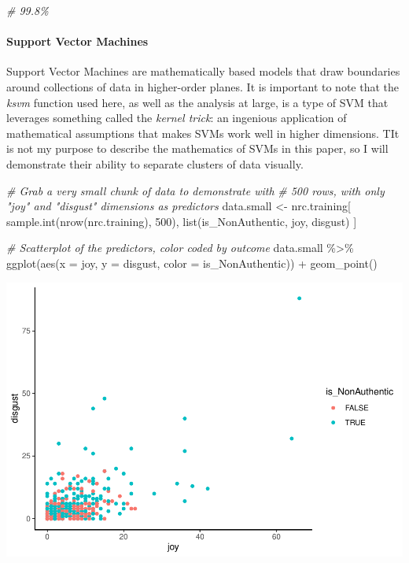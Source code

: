 \documentclass[
]{article}
\newenvironment{Shaded}{\begin{snugshade}}{\end{snugshade}}
\newcommand{\AttributeTok}[1]{\textcolor[rgb]{0.77,0.63,0.00}{#1}}
\newcommand{\CommentTok}[1]{\textcolor[rgb]{0.56,0.35,0.01}{\textit{#1}}}
\newcommand{\DecValTok}[1]{\textcolor[rgb]{0.00,0.00,0.81}{#1}}
\newcommand{\FunctionTok}[1]{\textcolor[rgb]{0.00,0.00,0.00}{#1}}
\newcommand{\NormalTok}[1]{#1}
\newcommand{\OtherTok}[1]{\textcolor[rgb]{0.56,0.35,0.01}{#1}}
\newcommand{\SpecialCharTok}[1]{\textcolor[rgb]{0.00,0.00,0.00}{#1}}
\begin{document}
\begin{Shaded}
\begin{Highlighting}[]
\CommentTok{\# 99.8\%}
\end{Highlighting}
\end{Shaded}

\hypertarget{support-vector-machines}{%
\paragraph{Support Vector Machines}\label{support-vector-machines}}

Support Vector Machines are mathematically based models that draw
boundaries around collections of data in higher-order planes. It is
important to note that the \emph{ksvm} function used here, as well as
the analysis at large, is a type of SVM that leverages something called
the \emph{kernel trick}: an ingenious application of mathematical
assumptions that makes SVMs work well in higher dimensions. TIt is not
my purpose to describe the mathematics of SVMs in this paper, so I will
demonstrate their ability to separate clusters of data visually.

\begin{Shaded}
\begin{Highlighting}[]
\CommentTok{\# Grab a very small chunk of data to demonstrate with}
\CommentTok{\# 500 rows, with only "joy" and "disgust" dimensions as predictors}
\NormalTok{data.small }\OtherTok{\textless{}{-}}\NormalTok{ nrc.training[}
  \FunctionTok{sample.int}\NormalTok{(}\FunctionTok{nrow}\NormalTok{(nrc.training), }\DecValTok{500}\NormalTok{),}
  \FunctionTok{list}\NormalTok{(is\_NonAuthentic, joy, disgust)}
\NormalTok{]}

\CommentTok{\# Scatterplot of the predictors, color coded by outcome}
\NormalTok{data.small }\SpecialCharTok{\%\textgreater{}\%}
  \FunctionTok{ggplot}\NormalTok{(}\FunctionTok{aes}\NormalTok{(}\AttributeTok{x =}\NormalTok{ joy, }\AttributeTok{y =}\NormalTok{ disgust, }\AttributeTok{color =}\NormalTok{ is\_NonAuthentic)) }\SpecialCharTok{+}
  \FunctionTok{geom\_point}\NormalTok{()}
\end{Highlighting}
\end{Shaded}

\includegraphics{report_files/figure-latex/illustrate_svm_prep-1.pdf}
\end{document}
